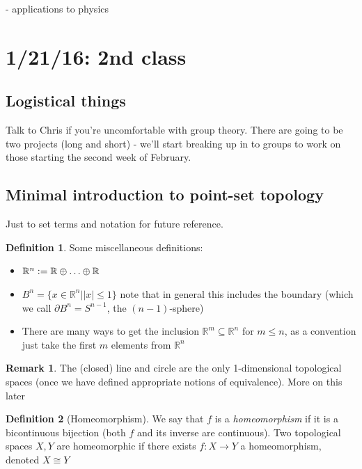 \documentclass[11pt]{article}
\newcommand{\R}{\mathbb{R}}
\newcommand{\set}[1]{\{ #1 \}}
\newcommand{\abs}[1]{\left| #1 \right|}
\newcommand{\defeq}{\vcentcolon=}
\theoremstyle{plain}
\theoremstyle{definition}
\newtheorem{remark}{Remark}
\newtheorem{definition}{Definition}
\begin{document}
- applications to physics

\clearpage
\section{1/21/16: 2nd class}

\subsection{Logistical things}

Talk to Chris if you're uncomfortable with group theory. There are going to be two projects (long and short) - we'll start breaking up in to groups to work on those starting the second week of February.

\subsection{Minimal introduction to point-set topology}

Just to set terms and notation for future reference.


\begin{definition}
  Some miscellaneous definitions:

  \begin{itemize}
  \item $\R^n \defeq \R \oplus \ldots \oplus \R$
  \item $B^n = \set{x \in \R^n | \abs{x} \leq 1}$ note that in general this includes the boundary (which we call $\partial B^n = S^{n -1}$, the $(n - 1)$-sphere)
  \item There are many ways to get the inclusion $\R^m \subseteq \R^n$ for $m \leq n$, as a convention just take the first $m$ elements from $\R^n$
  \end{itemize}
\end{definition}


\begin{remark}
  The (closed) line and circle are the only 1-dimensional topological spaces (once we have defined appropriate notions of equivalence). More on this later
\end{remark}


\begin{definition}[Homeomorphism]

  We say that $f$ is a \emph{homeomorphism} if it is a bicontinuous bijection (both $f$ and its inverse are continuous). Two topological spaces $X, Y$ are homeomorphic
  if there exists $f: X \to Y$ a homeomorphism, denoted $X \cong Y$
\end{definition}
\end{document}
